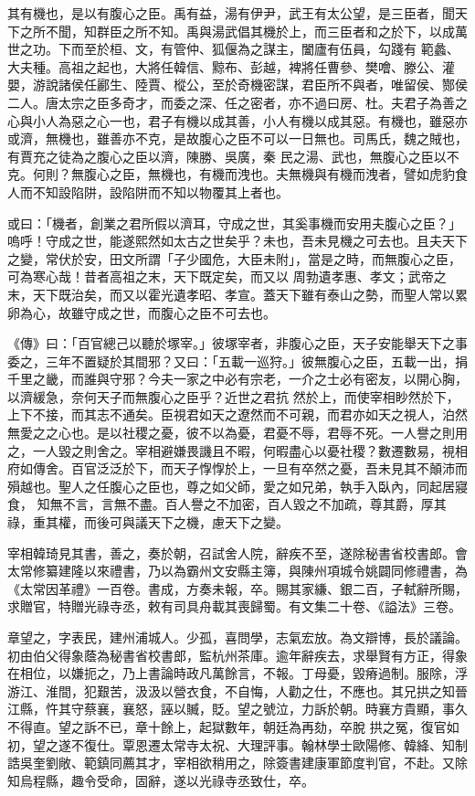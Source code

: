 \begin{pinyinscope}
 其有機也，是以有腹心之臣。禹有益，湯有伊尹，武王有太公望，是三臣者，聞天下之所不聞，知群臣之所不知。禹與湯武倡其機於上，而三臣者和之於下，以成萬世之功。下而至於桓、文，有管仲、狐偃為之謀主，闔廬有伍員，勾踐有
 範蠡、大夫種。高祖之起也，大將任韓信、黥布、彭越，裨將任曹參、樊噲、滕公、灌嬰，游說諸侯任酈生、陸賈、樅公，至於奇機密謀，君臣所不與者，唯留侯、酂侯二人。唐太宗之臣多奇才，而委之深、任之密者，亦不過曰房、杜。夫君子為善之心與小人為惡之心一也，君子有機以成其善，小人有機以成其惡。有機也，雖惡亦或濟，無機也，雖善亦不克，是故腹心之臣不可以一日無也。司馬氏，魏之賊也，有賈充之徒為之腹心之臣以濟，陳勝、吳廣，秦
 民之湯、武也，無腹心之臣以不克。何則？無腹心之臣，無機也，有機而洩也。夫無機與有機而洩者，譬如虎豹食人而不知設陷阱，設陷阱而不知以物覆其上者也。



 或曰：「機者，創業之君所假以濟耳，守成之世，其奚事機而安用夫腹心之臣？」嗚呼！守成之世，能遂熙然如太古之世矣乎？未也，吾未見機之可去也。且夫天下之變，常伏於安，田文所謂「子少國危，大臣未附」，當是之時，而無腹心之臣，可為寒心哉！昔者高祖之末，天下既定矣，而又以
 周勃遺孝惠、孝文；武帝之末，天下既治矣，而又以霍光遺孝昭、孝宣。蓋天下雖有泰山之勢，而聖人常以累卵為心，故雖守成之世，而腹心之臣不可去也。



 《傳》曰：「百官總己以聽於塚宰。」彼塚宰者，非腹心之臣，天子安能舉天下之事委之，三年不置疑於其間邪？又曰：「五載一巡狩。」彼無腹心之臣，五載一出，捐千里之畿，而誰與守邪？今夫一家之中必有宗老，一介之士必有密友，以開心胸，以濟緩急，奈何天子而無腹心之臣乎？近世之君抗
 然於上，而使宰相眇然於下，上下不接，而其志不通矣。臣視君如天之遼然而不可親，而君亦如天之視人，泊然無愛之之心也。是以社稷之憂，彼不以為憂，君憂不辱，君辱不死。一人譽之則用之，一人毀之則舍之。宰相避嫌畏譏且不暇，何暇盡心以憂社稷？數遷數易，視相府如傳舍。百官泛泛於下，而天子惸惸於上，一旦有卒然之憂，吾未見其不顛沛而殞越也。聖人之任腹心之臣也，尊之如父師，愛之如兄弟，執手入臥內，同起居寢食，
 知無不言，言無不盡。百人譽之不加密，百人毀之不加疏，尊其爵，厚其祿，重其權，而後可與議天下之機，慮天下之變。



 宰相韓琦見其書，善之，奏於朝，召試舍人院，辭疾不至，遂除秘書省校書郎。會太常修纂建隆以來禮書，乃以為霸州文安縣主簿，與陳州項城令姚闢同修禮書，為《太常因革禮》一百卷。書成，方奏未報，卒。賜其家縑、銀二百，子軾辭所賜，求贈官，特贈光祿寺丞，敕有司具舟載其喪歸蜀。有文集二十卷、《謚法》三卷。



 章望之，字表民，建州浦城人。少孤，喜問學，志氣宏放。為文辯博，長於議論。初由伯父得象蔭為秘書省校書郎，監杭州茶庫。逾年辭疾去，求舉賢有方正，得象在相位，以嫌扼之，乃上書論時政凡萬餘言，不報。丁母憂，毀瘠過制。服除，浮游江、淮間，犯艱苦，汲汲以營衣食，不自悔，人勸之仕，不應也。其兄拱之知晉江縣，忤其守蔡襄，襄怒，誣以贓，貶。望之號泣，力訴於朝。時襄方貴顯，事久不得直。望之訴不已，章十餘上，起獄數年，朝廷為再劾，卒脫
 拱之冤，復官如初，望之遂不復仕。覃恩遷太常寺太祝、大理評事。翰林學士歐陽修、韓絳、知制誥吳奎劉敞、範鎮同薦其才，宰相欲稍用之，除簽書建康軍節度判官，不赴。又除知烏程縣，趣令受命，固辭，遂以光祿寺丞致仕，卒。




\end{pinyinscope}
